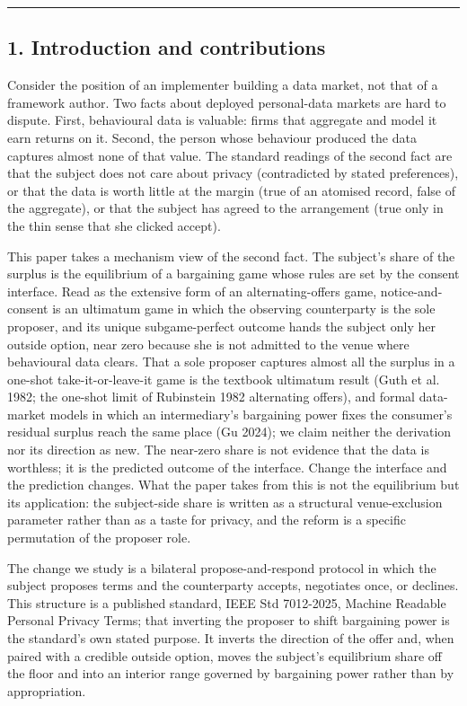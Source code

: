 \documentclass[
  11pt,
]{article}
\newcounter{none} %
\begin{document}
\begin{center}\rule{0.5\linewidth}{0.5pt}\end{center}

\subsection{1. Introduction and
contributions}\label{introduction-and-contributions}

Consider the position of an implementer building a data market, not that
of a framework author. Two facts about deployed personal-data markets
are hard to dispute. First, behavioural data is valuable: firms that
aggregate and model it earn returns on it. Second, the person whose
behaviour produced the data captures almost none of that value. The
standard readings of the second fact are that the subject does not care
about privacy (contradicted by stated preferences), or that the data is
worth little at the margin (true of an atomised record, false of the
aggregate), or that the subject has agreed to the arrangement (true only
in the thin sense that she clicked accept).

This paper takes a mechanism view of the second fact. The subject's
share of the surplus is the equilibrium of a bargaining game whose rules
are set by the consent interface. Read as the extensive form of an
alternating-offers game, notice-and-consent is an ultimatum game in
which the observing counterparty is the sole proposer, and its unique
subgame-perfect outcome hands the subject only her outside option, near
zero because she is not admitted to the venue where behavioural data
clears. That a sole proposer captures almost all the surplus in a
one-shot take-it-or-leave-it game is the textbook ultimatum result (Guth
et al. 1982; the one-shot limit of Rubinstein 1982 alternating offers),
and formal data-market models in which an intermediary's bargaining
power fixes the consumer's residual surplus reach the same place (Gu
2024); we claim neither the derivation nor its direction as new. The
near-zero share is not evidence that the data is worthless; it is the
predicted outcome of the interface. Change the interface and the
prediction changes. What the paper takes from this is not the
equilibrium but its application: the subject-side share is written as a
structural venue-exclusion parameter rather than as a taste for privacy,
and the reform is a specific permutation of the proposer role.

The change we study is a bilateral propose-and-respond protocol in which
the subject proposes terms and the counterparty accepts, negotiates
once, or declines. This structure is a published standard, IEEE Std
7012-2025, Machine Readable Personal Privacy Terms; that inverting the
proposer to shift bargaining power is the standard's own stated purpose.
It inverts the direction of the offer and, when paired with a credible
outside option, moves the subject's equilibrium share off the floor and
into an interior range governed by bargaining power rather than by
appropriation.
\end{document}
